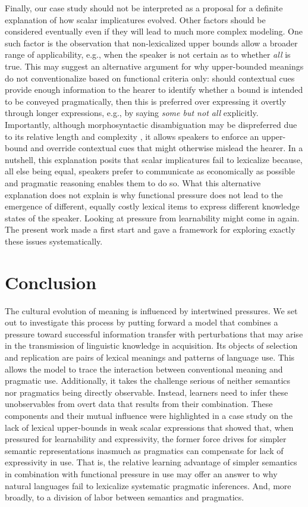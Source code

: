 \documentclass[a4paper, 11pt]{article}
\theoremstyle{Satz}
\begin{document}
Finally, our case study should not be interpreted as a proposal for a definite explanation of
how scalar implicatures evolved. Other factors should be considered eventually even if they
will lead to much more complex modeling. One such factor is the observation that
non-lexicalized upper bounds allow a broader range of applicability, e.g., when the speaker is
not certain as to whether \emph{all} is true. This may suggest an alternative argument for why
upper-bounded meanings do not conventionalize based on functional criteria only: should
contextual cues provide enough information to the hearer to identify whether a bound is
intended to be conveyed pragmatically, then this is preferred over expressing it overtly
through longer expressions, e.g., by saying {\em some but not all} explicitly. Importantly,
although morphosyntactic disambiguation may be dispreferred due to its relative length and
complexity \citep{piantadosi+etal:2012b}, it allows speakers to enforce an upper-bound and
override contextual cues that might otherwise mislead the hearer. In a nutshell, this
explanation posits that scalar implicatures fail to lexicalize because, all else being equal,
speakers prefer to communicate as economically as possible and pragmatic reasoning enables them
to do so. What this alternative explanation does not explain is why functional pressure does
not lead to the emergence of different, equally costly lexical items to express different
knowledge states of the speaker. Looking at pressure from learnability might come in again. The
present work made a first start and gave a framework for exploring exactly these issues
systematically.

\section{Conclusion}
The cultural evolution of meaning is influenced by intertwined pressures. We set out to
investigate this process by putting forward a model that combines a pressure toward successful
information transfer with perturbations that may arise in the transmission of linguistic
knowledge in acquisition. Its objects of selection and replication are pairs of lexical
meanings and patterns of language use. This allows the model to trace the interaction between
conventional meaning and pragmatic use. Additionally, it takes the challenge serious of neither
semantics nor pragmatics being directly observable. Instead, learners need to infer these
unobservables from overt data that results from their combination.  These components and their
mutual influence were highlighted in a case study on the lack of lexical upper-bounds in weak
scalar expressions that showed that, when pressured for learnability and expressivity, the
former force drives for simpler semantic representations inasmuch as pragmatics can compensate
for lack of expressivity in use. That is, the relative learning advantage of simpler semantics
in combination with functional pressure in use may offer an answer to why natural languages
fail to lexicalize systematic pragmatic inferences. And, more broadly, to a division of labor
between semantics and pragmatics.
\end{document}
